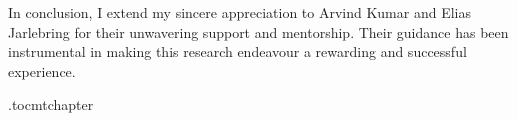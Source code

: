In conclusion, I extend my sincere appreciation to Arvind Kumar and Elias Jarlebring for their unwavering support and mentorship. Their guidance has been instrumental in making this research endeavour a rewarding and successful experience.

\newpage



\newpage

\etocdepthtag.toc{mtchapter}
\thispagestyle{plain}
\tableofcontents

\newpage


